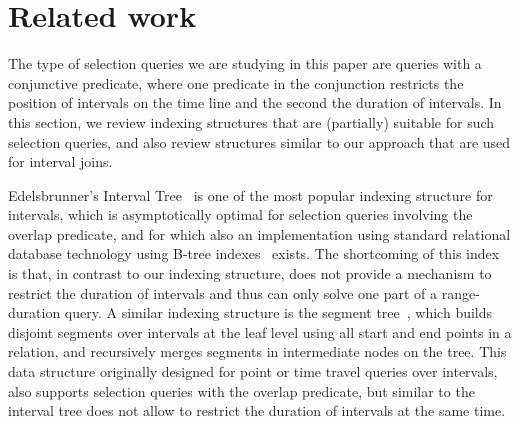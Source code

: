 \documentclass[sigconf,nonacm,anonymous]{acmart}
\theoremstyle{definition}
\begin{document}
% 	


\section{Related work}

The type of selection queries we are studying in this paper are queries with a conjunctive predicate, where one predicate in the conjunction restricts the position of intervals on the time line and the second the duration of intervals. In this section, we review indexing structures that are (partially) suitable for such selection queries, and also review structures similar to our approach that are used for interval joins.

Edelsbrunner's Interval Tree~\cite{edelsbrunner80} is one of the most popular indexing structure for intervals, which is asymptotically optimal for selection queries involving the overlap predicate, and for which also an implementation using standard relational database technology using B-tree indexes~\cite{DBLP:conf/vldb/KriegelPS00} exists. The shortcoming of this index is that, in contrast to our indexing structure, does not provide a mechanism to restrict the duration of intervals and thus can only solve one part of a range-duration query. A similar indexing structure is the segment tree~\cite{deBerg00}, which builds disjoint segments over intervals at the
leaf level using all start and end points in a relation, and recursively merges segments in intermediate nodes on the tree. This data structure originally designed for point or time travel queries over intervals, also supports selection queries with the overlap predicate, but similar to the interval tree does not allow to restrict the duration of intervals at the same time.

\end{document}
